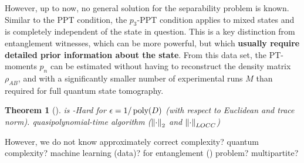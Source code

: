 \documentclass[
reprint,
aps,
pra,
]{revtex4-2}
\theoremstyle{plain}
\newtheorem{theorem}{Theorem}
\newtheorem{question}{Question}
\theoremstyle{definition}
\newcommand{\dm}{\rho}
\begin{document}
However, up to now, no general solution for the separability problem is known.
Similar to the PPT condition, the $p_3$-PPT condition applies to mixed states and is completely independent of the state in question. This is a key distinction from entanglement witnesses, which can be more powerful, but which \textbf{usually require detailed prior information about the state}.
From this data set, the PT-moments $p_n$ can be estimated without having to reconstruct the density matrix $\dm_{AB}$, and with a significantly smaller number of experimental runs $M$ than required for full quantum state tomography.
\begin{theorem}[\cite{gurvitsClassicalDeterministicComplexity2003}]
	 is -Hard for $\epsilon=1/\operatorname{\textup{poly}}(D)$ (with respect to Euclidean  and trace norm).
	\cite{ioannouComputationalComplexityQuantum2007}
	\cite{dohertyCompleteFamilySeparability2004}
	quasipolynomial-time algorithm ($\norm{\cdot}_2$ and $\norm{\cdot}_{LOCC}$) \cite{brandaoQuasipolynomialtimeAlgorithmQuantum2011}
\end{theorem}
	However, we do not know 
	approximately correct complexity? quantum complexity? machine learning (data)? for entanglement () problem? multipartite?
\end{document}
